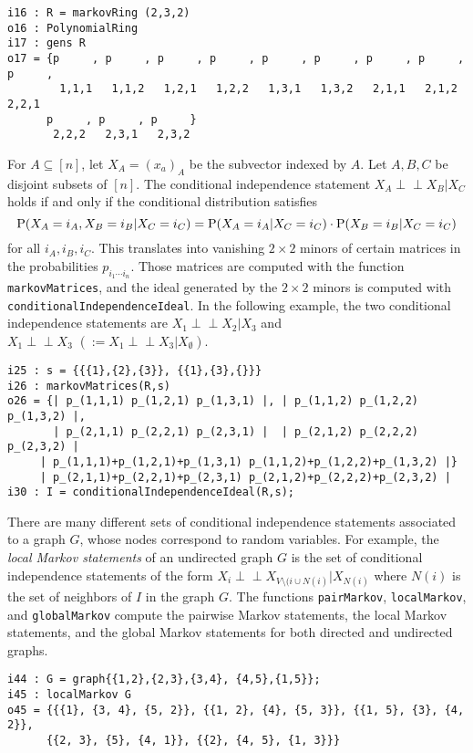 \documentclass[letterpaper]{article}
\theoremstyle{definition}
\def\ci{\perp\!\!\!\perp}
\begin{document}
\begin{verbatim}
i16 : R = markovRing (2,3,2)
o16 : PolynomialRing
i17 : gens R
o17 = {p     , p     , p     , p     , p     , p     , p     , p     , p     ,
        1,1,1   1,1,2   1,2,1   1,2,2   1,3,1   1,3,2   2,1,1   2,1,2   2,2,1 
      p     , p     , p     }
       2,2,2   2,3,1   2,3,2
\end{verbatim}

For $A \subseteq [n]$, let $X_{A} = (x_{a})_{A}$ be the subvector
indexed by $A$.  Let $A,B,C$ be disjoint subsets of $[n]$.  
The conditional independence statement
$X_{A} \ci X_{B} | X_{C}$ holds if and only if the conditional
distribution satisfies
$$
{\rm P}(X_{A} = i_{A}, X_{B} = i_{B} | X_{C} = i_{C}) =
{\rm P}(X_{A} = i_{A} | X_{C} = i_{C})\cdot {\rm P}( X_{B} = i_{B} | X_{C} = i_{C})$$
for all $i_{A}, i_{B}, i_{C}$.   This translates into vanishing
$2\times 2$ minors of certain matrices in the probabilities 
$p_{i_{1}\cdots i_{n}}$.  Those matrices are computed with the 
function {\tt markovMatrices},
and the ideal generated by the $2 \times 2$ minors is computed with 
{\tt conditionalIndependenceIdeal}.  In the following example,
the two conditional independence statements are $X_{1} \ci X_{2} | X_{3}$
and $X_{1} \ci X_{3} \, \,  (:=  X_{1} \ci X_{3} | X_{\emptyset})$.

\begin{verbatim}
i25 : s = {{{1},{2},{3}}, {{1},{3},{}}}
i26 : markovMatrices(R,s)
o26 = {| p_(1,1,1) p_(1,2,1) p_(1,3,1) |, | p_(1,1,2) p_(1,2,2) p_(1,3,2) |, 
       | p_(2,1,1) p_(2,2,1) p_(2,3,1) |  | p_(2,1,2) p_(2,2,2) p_(2,3,2) |  
     | p_(1,1,1)+p_(1,2,1)+p_(1,3,1) p_(1,1,2)+p_(1,2,2)+p_(1,3,2) |}
     | p_(2,1,1)+p_(2,2,1)+p_(2,3,1) p_(2,1,2)+p_(2,2,2)+p_(2,3,2) |
i30 : I = conditionalIndependenceIdeal(R,s);      
\end{verbatim}

There are many different sets of conditional independence statements
associated to a graph $G$, whose nodes correspond to random variables.
For example, the \emph{local Markov statements} of an undirected graph $G$
is the set of conditional independence statements of the form
$X_{i} \ci X_{V \setminus (i \cup N(i)} | X_{N(i)}$
where $N(i)$ is the set of neighbors of $I$ in the graph $G$.
The functions {\tt pairMarkov}, {\tt localMarkov}, and {\tt globalMarkov}
compute the pairwise Markov statements, the local Markov statements, and the global Markov statements for both directed and undirected graphs.

\begin{verbatim}
i44 : G = graph{{1,2},{2,3},{3,4}, {4,5},{1,5}};
i45 : localMarkov G
o45 = {{{1}, {3, 4}, {5, 2}}, {{1, 2}, {4}, {5, 3}}, {{1, 5}, {3}, {4, 2}}, 
      {{2, 3}, {5}, {4, 1}}, {{2}, {4, 5}, {1, 3}}}
\end{verbatim}
\end{document}
